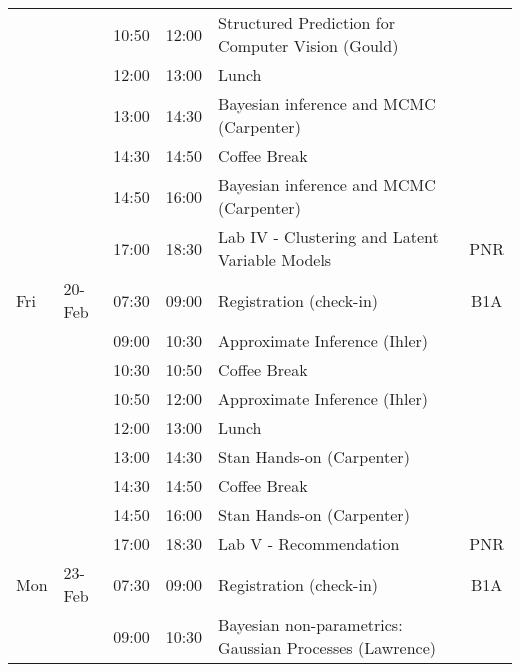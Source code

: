 \begin{longtable}{  p{0.5cm} l l l p{9cm}  c    }
    &        & 10:50 & 12:00 & Structured Prediction for Computer Vision (Gould)                 &                   \\
    &        & 12:00 & 13:00 & Lunch                                                             &                   \\
    &        & 13:00 & 14:30 & Bayesian inference and MCMC (Carpenter)                           &                   \\
    &        & 14:30 & 14:50 & Coffee Break                                                      &                   \\
    &        & 14:50 & 16:00 & Bayesian inference and MCMC (Carpenter)                           &                   \\
    &        & 17:00 & 18:30 & Lab IV - Clustering and Latent Variable Models                    & PNR      \\
    \midrule
Fri & 20-Feb & 07:30 & 09:00 & Registration (check-in)                                           &B1A \\
    &        & 09:00 & 10:30 & Approximate Inference (Ihler)                                     &                   \\
    &        & 10:30 & 10:50 & Coffee Break                                                      &                   \\
    &        & 10:50 & 12:00 & Approximate Inference (Ihler)                                     &                   \\
    &        & 12:00 & 13:00 & Lunch                                                             &                   \\
    &        & 13:00 & 14:30 & Stan Hands-on (Carpenter)                                         &                   \\
    &        & 14:30 & 14:50 & Coffee Break                                                      &                   \\
    &        & 14:50 & 16:00 & Stan Hands-on (Carpenter)                                         &                   \\
    &        & 17:00 & 18:30 & Lab V - Recommendation                                            & PNR      \\
    \midrule
Mon & 23-Feb & 07:30 & 09:00 & Registration (check-in)                                           &B1A \\
    &        & 09:00 & 10:30 & Bayesian non-parametrics: Gaussian Processes (Lawrence)           &                   \\

\end{longtable}
